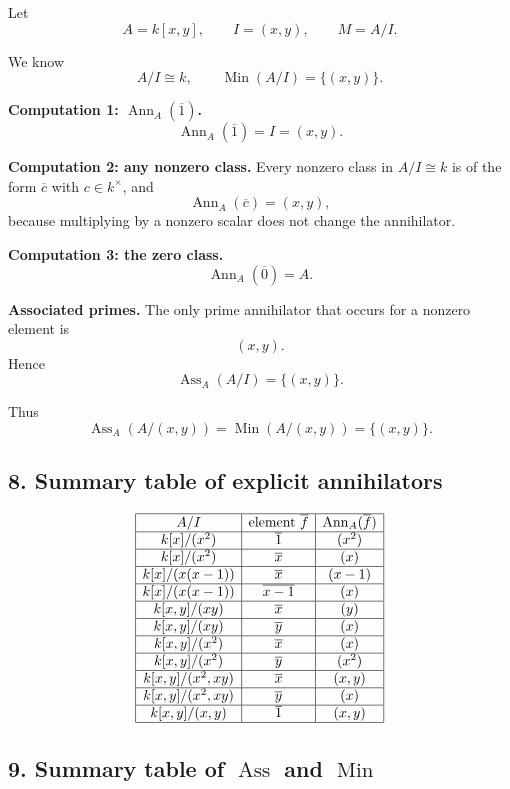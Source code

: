 \documentclass[12pt,a4paper]{article}
\theoremstyle{notespace}
\DeclareMathOperator{\Ass}{Ass}
\DeclareMathOperator{\Ann}{Ann}
\DeclareMathOperator{\Min}{Min}
\begin{document}
Let
\[
A=k[x,y],\qquad I=(x,y),\qquad M=A/I.
\]

We know
\[
A/I\cong k,
\qquad
\Min(A/I)=\{(x,y)\}.
\]

\textbf{Computation 1: \(\Ann_A(\overline 1)\).}
\[
\Ann_A(\overline 1)=I=(x,y).
\]

\textbf{Computation 2: any nonzero class.}
Every nonzero class in \(A/I\cong k\) is of the form \(\overline c\) with \(c\in k^\times\), and
\[
\Ann_A(\overline c)=(x,y),
\]
because multiplying by a nonzero scalar does not change the annihilator.

\textbf{Computation 3: the zero class.}
\[
\Ann_A(\overline 0)=A.
\]

\textbf{Associated primes.}
The only prime annihilator that occurs for a nonzero element is
\[
(x,y).
\]
Hence
\[
\Ass_A(A/I)=\{(x,y)\}.
\]

Thus
\[
\Ass_A(A/(x,y))=\Min(A/(x,y))=\{(x,y)\}.
\]

\subsection*{8. Summary table of explicit annihilators}

\[
\begin{array}{|c|c|c|}
	\hline
	A/I & \text{element } \overline f & \Ann_A(\overline f) \\
	\hline
	k[x]/(x^2) & \overline 1 & (x^2) \\
	\hline
	k[x]/(x^2) & \overline x & (x) \\
	\hline
	k[x]/(x(x-1)) & \overline x & (x-1) \\
	\hline
	k[x]/(x(x-1)) & \overline{x-1} & (x) \\
	\hline
	k[x,y]/(xy) & \overline x & (y) \\
	\hline
	k[x,y]/(xy) & \overline y & (x) \\
	\hline
	k[x,y]/(x^2) & \overline x & (x) \\
	\hline
	k[x,y]/(x^2) & \overline y & (x^2) \\
	\hline
	k[x,y]/(x^2,xy) & \overline x & (x,y) \\
	\hline
	k[x,y]/(x^2,xy) & \overline y & (x) \\
	\hline
	k[x,y]/(x,y) & \overline 1 & (x,y) \\
	\hline
\end{array}
\]

\subsection*{9. Summary table of \(\Ass\) and \(\Min\)}
\end{document}
